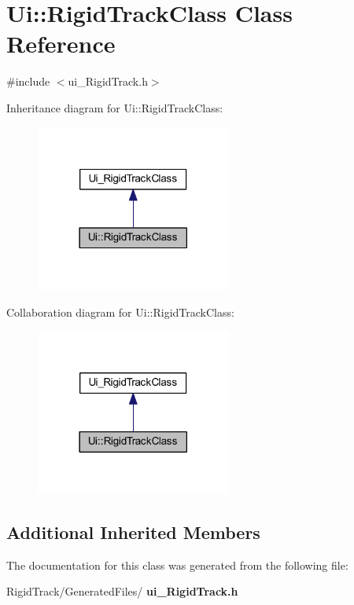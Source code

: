 \section{Ui\+:\+:Rigid\+Track\+Class Class Reference}
\label{class_ui_1_1_rigid_track_class}


{\ttfamily \#include $<$ui\+\_\+\+Rigid\+Track.\+h$>$}



Inheritance diagram for Ui\+:\+:Rigid\+Track\+Class\+:\nopagebreak
\begin{figure}[H]
\begin{center}
\leavevmode
\includegraphics[width=182pt]{class_ui_1_1_rigid_track_class__inherit__graph}
\end{center}
\end{figure}


Collaboration diagram for Ui\+:\+:Rigid\+Track\+Class\+:\nopagebreak
\begin{figure}[H]
\begin{center}
\leavevmode
\includegraphics[width=182pt]{class_ui_1_1_rigid_track_class__coll__graph}
\end{center}
\end{figure}
\subsection*{Additional Inherited Members}


The documentation for this class was generated from the following file\+:\begin{DoxyCompactItemize}
\item 
Rigid\+Track/\+Generated\+Files/\textbf{ ui\+\_\+\+Rigid\+Track.\+h}\end{DoxyCompactItemize}

